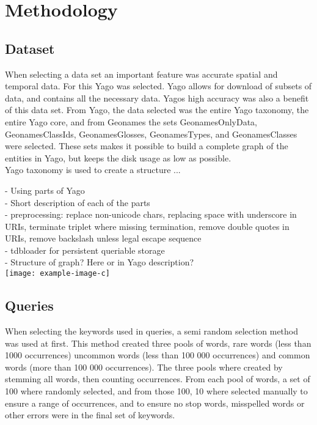 
\chapter{Methodology}

\section{Dataset}
When selecting a data set an important feature was accurate spatial and temporal data. For this Yago was selected. Yago allows for download of subsets of data, and contains all the necessary data. Yagos high accuracy was also a benefit of this data set. From Yago, the data selected was the entire Yago taxonomy, the entire Yago core, and from Geonames the sets GeonamesOnlyData, GeonamesClassIds, GeonamesGlosses, GeonamesTypes, and GeonamesClasses were selected. These sets makes it possible to build a complete graph of the entities in Yago, but keeps the disk usage as low as possible.\\

Yago taxonomy is used to create a structure ...

- Using parts of Yago\\
- Short description of each of the parts\\
- preprocessing: replace non-unicode chars, replacing space with underscore in URIs, terminate triplet where missing termination, remove double quotes in URIs, remove backslash unless legal escape sequence\\
- tdbloader for persistent queriable storage\\
- Structure of graph? Here or in Yago description?\\


\texttt{[image: example-image-c]}

\section{Queries}
When selecting the keywords used in queries, a semi random selection method was used at first. This method created three pools of words, rare words (less than 1000 occurrences) uncommon words (less than 100 000 occurrences) and common words (more than 100 000 occurrences). The three pools where created by stemming all words, then counting occurrences. From each pool of words, a set of 100 where randomly selected, and from those 100, 10 where selected manually to ensure a range of occurrences, and to ensure no stop words, misspelled words or other errors were in the final set of keywords.\\

